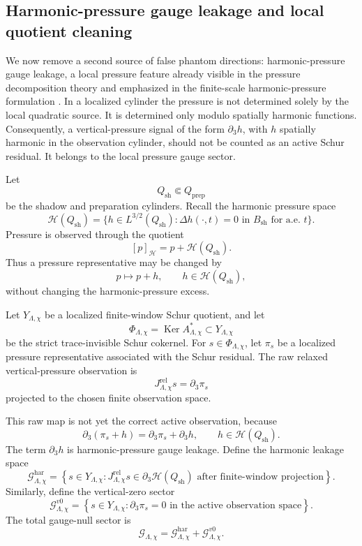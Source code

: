 \documentclass[11pt]{article}
\numberwithin{equation}{section}
\DeclareMathOperator{\Ker}{Ker}
\begin{document}
\subsection{Harmonic-pressure gauge leakage and local quotient cleaning}\label{subsec:harmonic-gauge-cleaning}

We now remove a second source of false phantom directions: harmonic-pressure gauge leakage, a local pressure feature already visible in the pressure decomposition theory \cite{SohrWahl1986,Wolf2017} and emphasized in the finite-scale harmonic-pressure formulation \cite{Yu2026HarmonicPressure}.  In a localized cylinder the pressure is not determined solely by the local quadratic source.  It is determined only modulo spatially harmonic functions.  Consequently, a vertical-pressure signal of the form \(\partial_3h\), with \(h\) spatially harmonic in the observation cylinder, should not be counted as an active Schur residual.  It belongs to the local pressure gauge sector.

Let
\[
        Q_{\mathrm{sh}}\Subset Q_{\mathrm{prep}}
\]
be the shadow and preparation cylinders.  Recall the harmonic pressure space
\[
        \mathcal H(Q_{\mathrm{sh}})
        =\{h\in L^{3/2}(Q_{\mathrm{sh}}):
        \Delta h(\cdot,t)=0
        \text{ in }B_{\mathrm{sh}}
        \text{ for a.e. }t\}.
\]
Pressure is observed through the quotient
\[
        [p]_{\mathcal H}=p+\mathcal H(Q_{\mathrm{sh}}).
\]
Thus a pressure representative may be changed by
\[
        p\mapsto p+h,
        \qquad
        h\in\mathcal H(Q_{\mathrm{sh}}),
\]
without changing the harmonic-pressure excess.

Let \(Y_{\Lambda,\chi}\) be a localized finite-window Schur quotient, and let
\[
        \Phi_{\Lambda,\chi}
        =\Ker A_{\Lambda,\chi}^*
        \subset Y_{\Lambda,\chi}
\]
be the strict trace-invisible Schur cokernel.  For \(s\in\Phi_{\Lambda,\chi}\), let \(\pi_s\) be a localized pressure representative associated with the Schur residual.  The raw relaxed vertical-pressure observation is
\[
        J_{\Lambda,\chi}^{\mathrm{rel}}s
        =\partial_3\pi_s
\]
projected to the chosen finite observation space.

This raw map is not yet the correct active observation, because
\[
        \partial_3(\pi_s+h)
        =\partial_3\pi_s+\partial_3h,
        \qquad
        h\in\mathcal H(Q_{\mathrm{sh}}).
\]
The term \(\partial_3h\) is harmonic-pressure gauge leakage.  Define the harmonic leakage space
\[
        \mathcal G_{\Lambda,\chi}^{\mathrm{har}}
        =
        \left\{
        s\in Y_{\Lambda,\chi}:
        J_{\Lambda,\chi}^{\mathrm{rel}}s
        \in
        \partial_3\mathcal H(Q_{\mathrm{sh}})
        \text{ after finite-window projection}
        \right\}.
\]
Similarly, define the vertical-zero sector
\[
        \mathcal G_{\Lambda,\chi}^{v0}
        =
        \left\{
        s\in Y_{\Lambda,\chi}:
        \partial_3\pi_s=0
        \text{ in the active observation space}
        \right\}.
\]
The total gauge-null sector is
\[
        \mathcal G_{\Lambda,\chi}
        =\mathcal G_{\Lambda,\chi}^{\mathrm{har}}
        +\mathcal G_{\Lambda,\chi}^{v0}.
\]
\end{document}
